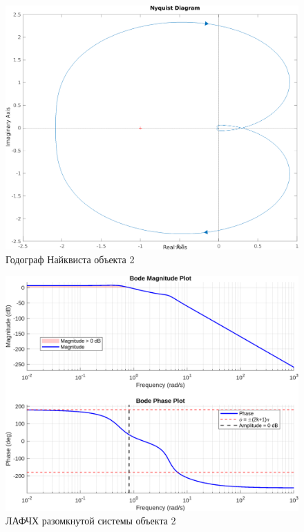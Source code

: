 \begin{figure}[H]
    \centering
    \includegraphics[width=\textwidth]{figs/task_1_obj_2_nyquist.png}
    \caption{Годограф Найквиста объекта 2}
    \label{fig:obj2_nyquist}
\end{figure}

\begin{figure}[H]
    \centering
    \includegraphics[width=\textwidth]{figs/task_1_obj_2_bode.png}
    \caption{ЛАФЧХ разомкнутой системы объекта 2}
    \label{fig:obj2_bode}
\end{figure}

